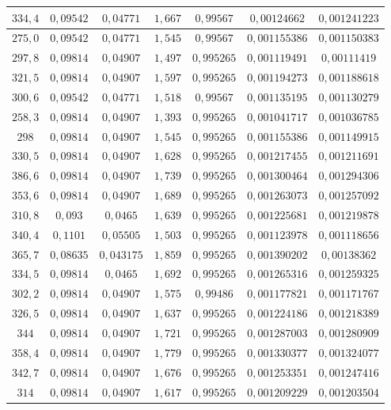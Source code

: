 \documentclass[]{article}
\begin{document}
\begin{table}
\begin{tabular}{||c|c|c|c|c|c|c||}
 
        $334,4$ & $0,09542$ & $0,04771 $ & $1,667$ & $0,99567 $ & $0,00124662 $ & $0,001241223$ \\\hline
        $275,0$ & $0,09542$ & $0,04771 $ & $1,545$ & $0,99567 $ & $0,001155386$ & $0,001150383$ \\\hline
        $297,8$ & $0,09814$ & $0,04907 $ & $1,497$ & $0,995265$ & $0,001119491$ & $0,00111419 $ \\\hline
        $321,5$ & $0,09814$ & $0,04907 $ & $1,597$ & $0,995265$ & $0,001194273$ & $0,001188618$ \\\hline
        $300,6$ & $0,09542$ & $0,04771 $ & $1,518$ & $0,99567 $ & $0,001135195$ & $0,001130279$ \\\hline
        $258,3$ & $0,09814$ & $0,04907 $ & $1,393$ & $0,995265$ & $0,001041717$ & $0,001036785$ \\\hline
        $298  $ & $0,09814$ & $0,04907 $ & $1,545$ & $0,995265$ & $0,001155386$ & $0,001149915$ \\\hline
        $330,5$ & $0,09814$ & $0,04907 $ & $1,628$ & $0,995265$ & $0,001217455$ & $0,001211691$ \\\hline
        $386,6$ & $0,09814$ & $0,04907 $ & $1,739$ & $0,995265$ & $0,001300464$ & $0,001294306$ \\\hline
        $353,6$ & $0,09814$ & $0,04907 $ & $1,689$ & $0,995265$ & $0,001263073$ & $0,001257092$ \\\hline
        $310,8$ & $0,093  $ & $0,0465  $ & $1,639$ & $0,995265$ & $0,001225681$ & $0,001219878$ \\\hline
        $340,4$ & $0,1101 $ & $0,05505 $ & $1,503$ & $0,995265$ & $0,001123978$ & $0,001118656$ \\\hline
        $365,7$ & $0,08635$ & $0,043175$ & $1,859$ & $0,995265$ & $0,001390202$ & $0,00138362 $ \\\hline
        $334,5$ & $0,09814$ & $0,0465  $ & $1,692$ & $0,995265$ & $0,001265316$ & $0,001259325$ \\\hline
        $302,2$ & $0,09814$ & $0,04907 $ & $1,575$ & $0,99486 $ & $0,001177821$ & $0,001171767$ \\\hline
        $326,5$ & $0,09814$ & $0,04907 $ & $1,637$ & $0,995265$ & $0,001224186$ & $0,001218389$ \\\hline
        $344  $ & $0,09814$ & $0,04907 $ & $1,721$ & $0,995265$ & $0,001287003$ & $0,001280909$ \\\hline
        $358,4$ & $0,09814$ & $0,04907 $ & $1,779$ & $0,995265$ & $0,001330377$ & $0,001324077$ \\\hline
        $342,7$ & $0,09814$ & $0,04907 $ & $1,676$ & $0,995265$ & $0,001253351$ & $0,001247416$ \\\hline
        $314  $ & $0,09814$ & $0,04907 $ & $1,617$ & $0,995265$ & $0,001209229$ & $0,001203504$ \\\hline
    

\end{tabular}
\end{table}
\end{document}
